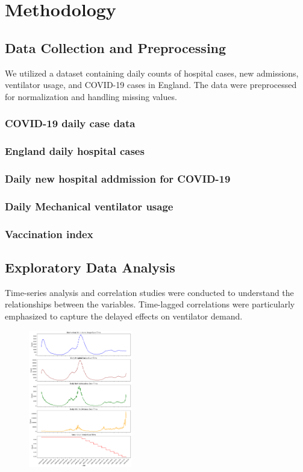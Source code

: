 \documentclass[lettersize, journal]{IEEEtran}
\begin{document}
\section{Methodology}
\subsection{Data Collection and Preprocessing}
We utilized a dataset containing daily counts of hospital cases, new admissions, ventilator usage, and COVID-19 cases in England. The data were preprocessed for normalization and handling missing values.

\subsubsection{COVID-19 daily case data}

\subsubsection{England daily hospital cases}

\subsubsection{Daily new hospital addmission for COVID-19}

\subsubsection{Daily Mechanical ventilator usage}

\subsubsection{Vaccination index}

\subsection{Exploratory Data Analysis}
Time-series analysis and correlation studies were conducted to understand the relationships between the variables. Time-lagged correlations were particularly emphasized to capture the delayed effects on ventilator demand.
\IEEEpubidadjcol
\begin{figure}[h]
    \centering
    \includegraphics[width=0.4\textwidth]{"../Research paper/images/trend_analysis_improved.pdf"}
\end{figure}
\end{document}
